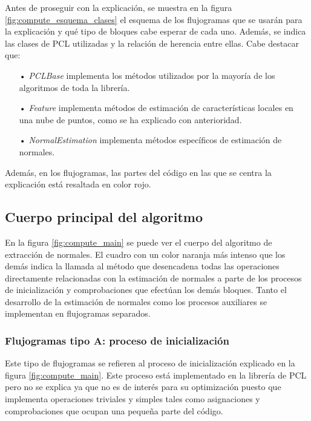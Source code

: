Antes de proseguir con la explicación, se muestra en la figura \ref{fig:compute_esquema_clases} el esquema de los flujogramas que se usarán para la explicación y qué tipo de bloques cabe esperar de cada uno. Además, se indica las clases de PCL utilizadas y la relación de herencia entre ellas. Cabe destacar que:

\begin{itemize}
\item[•]\textit{PCLBase}\cite{pclbase} implementa los métodos utilizados por la mayoría de los algoritmos de toda la librería.
\item[•]\textit{Feature}\cite{feature} implementa métodos de estimación de características locales en una nube de puntos, como se ha explicado con anterioridad.
\item[•]\textit{NormalEstimation}\cite{normal_estimation} implementa métodos específicos de estimación de normales.
\end{itemize} 

Además, en los flujogramas, las partes del código en las que se centra la explicación está resaltada en color rojo.


\subsection{Cuerpo principal del algoritmo}
En la figura \ref{fig:compute_main} se puede ver el cuerpo del algoritmo de extracción de normales. El cuadro con un color naranja más intenso que los demás indica la llamada al método que desencadena todas las operaciones directamente relacionadas con la estimación de normales a parte de los procesos de inicialización y comprobaciones que efectúan los demás bloques. Tanto el desarrollo de la estimación de normales como los procesos auxiliares se implementan en flujogramas separados.



\subsubsection{Flujogramas tipo A: proceso de inicialización}
Este tipo de flujogramas se refieren al proceso de inicialización explicado en la figura \ref{fig:compute_main}. Este proceso está implementado en la librería de PCL pero no se explica ya que no es de interés para su optimización puesto que implementa operaciones triviales y simples tales como asignaciones y comprobaciones que ocupan una pequeña parte del código.




